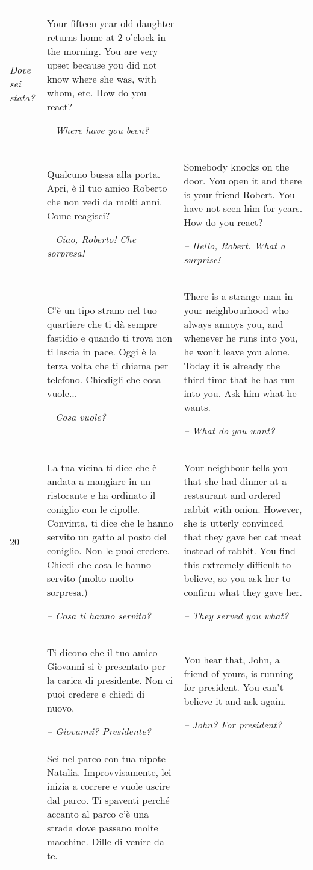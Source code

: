 \begin{xltabular}{\textwidth}{lQQ}
{\itshape -- Dove sei stata?} & Your fifteen-year-old daughter returns home at 2 o’clock in the morning. You are very upset because you did not know where she was, with whom, etc. How do you react?

{\itshape -- Where have you been?}\\
 & Qualcuno bussa alla porta. Apri, è il tuo amico Roberto che non vedi da molti anni. Come reagisci?

{\itshape -- Ciao, Roberto! Che sorpresa!} & Somebody knocks on the door. You open it and there is your friend Robert. You have not seen him for years. How do you react?

{\itshape -- Hello, Robert. What a surprise!}\\
 & C'è un tipo strano nel tuo quartiere che ti dà sempre fastidio e quando ti trova non ti lascia in pace. Oggi è la terza volta che ti chiama per telefono. Chiedigli che cosa vuole...

{\itshape -- Cosa vuole?} & There is a strange man in your neighbourhood who always annoys you, and whenever he runs into you, he won’t leave you alone. Today it is already the third time that he has run into you. Ask him what he wants.

{\itshape -- What do you want?}\\
20 & La tua vicina ti dice che è andata a mangiare in un ristorante e ha ordinato il coniglio con le cipolle. Convinta, ti dice che le hanno servito un gatto al posto del coniglio. Non le puoi credere. Chiedi che cosa le hanno servito (molto molto sorpresa.)

\textit{-- Cosa ti hanno servito?} & Your neighbour tells you that she had dinner at a restaurant and ordered rabbit with onion. However, she is utterly convinced that they gave her cat meat instead of rabbit. You find this extremely difficult to believe, so you ask her to confirm what they gave her.

{\itshape -- They served you what?}\\
 & Ti dicono che il tuo amico Giovanni si è presentato per la carica di presidente. Non ci puoi credere e chiedi di nuovo.

\textit{-- Giovanni? Presidente?} & You hear that, John, a friend of yours, is running for president. You can’t believe it and ask again.

{\itshape -- John? For president?}\\
 & Sei nel parco con tua nipote Natalia. Improvvisamente, lei inizia a correre e vuole uscire dal parco. Ti spaventi perché accanto al parco c'è una strada dove passano molte macchine. Dille di venire da te.


\end{xltabular}

